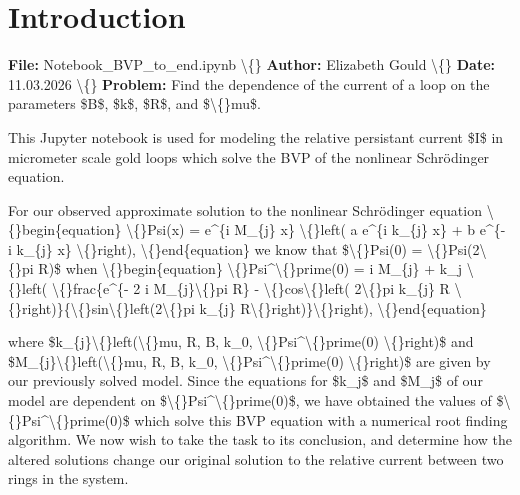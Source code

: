 \documentclass{article}
\begin{document}
\section{Introduction}


\textbf{File:} Notebook\_BVP\_to\_end.ipynb 
\textbackslash\{\}
\textbf{Author:} Elizabeth Gould
\textbackslash\{\}
\textbf{Date:} 11.03.2026
\textbackslash\{\}
\textbf{Problem:} Find the dependence of the current of a loop on the parameters \$B\$, \$k\$, \$R\$, and \$\textbackslash\{\}mu\$. 

This Jupyter notebook is used for modeling the relative persistant current \$I\$ in micrometer scale gold loops which solve the BVP of the nonlinear Schr\"{o}dinger equation. 

For our observed approximate solution to the nonlinear Schr\"{o}dinger equation
\textbackslash\{\}begin\{equation\}
\textbackslash\{\}Psi(x) = e\textasciicircum{}\{i M\_\{j\} x\} \textbackslash\{\}left( a e\textasciicircum{}\{i k\_\{j\} x\} + b e\textasciicircum{}\{- i k\_\{j\} x\} \textbackslash\{\}right),
\textbackslash\{\}end\{equation\}
we know that \$\textbackslash\{\}Psi(0) = \textbackslash\{\}Psi(2\textbackslash\{\}pi R)\$ when 
\textbackslash\{\}begin\{equation\}
\textbackslash\{\}Psi\textasciicircum{}\textbackslash\{\}prime(0) = i M\_\{j\} + k\_j \textbackslash\{\}left( \textbackslash\{\}frac\{e\textasciicircum{}\{- 2 i M\_\{j\}\textbackslash\{\}pi R\} - \textbackslash\{\}cos\textbackslash\{\}left( 2\textbackslash\{\}pi k\_\{j\} R \textbackslash\{\}right)\}\{\textbackslash\{\}sin\textbackslash\{\}left(2\textbackslash\{\}pi k\_\{j\} R\textbackslash\{\}right)\}\textbackslash\{\}right),
\textbackslash\{\}end\{equation\}

where \$k\_\{j\}\textbackslash\{\}left(\textbackslash\{\}mu, R, B, k\_0, \textbackslash\{\}Psi\textasciicircum{}\textbackslash\{\}prime(0) \textbackslash\{\}right)\$ and \$M\_\{j\}\textbackslash\{\}left(\textbackslash\{\}mu, R, B, k\_0, \textbackslash\{\}Psi\textasciicircum{}\textbackslash\{\}prime(0) \textbackslash\{\}right)\$ are given by our previously solved model. Since the equations for \$k\_j\$ and \$M\_j\$ of our model are dependent on \$\textbackslash\{\}Psi\textasciicircum{}\textbackslash\{\}prime(0)\$, we have obtained the values of \$\textbackslash\{\}Psi\textasciicircum{}\textbackslash\{\}prime(0)\$ which solve this BVP equation with a numerical root finding algorithm. We now wish to take the task to its conclusion, and determine how the altered solutions change our original solution to the relative current between two rings in the system.
\end{document}
